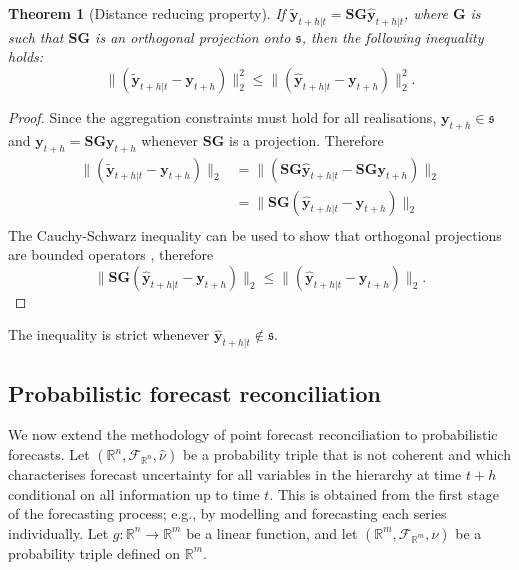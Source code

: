 \documentclass[12pt]{article}
\newtheorem{theo}{Theorem}[section]
\theoremstyle{definition}
\begin{document}
\begin{theo}[Distance reducing property]
	If $\tilde{\bm{y}}_{t+h|t}=\bm{S}\bm{G}\hat{\bm{y}}_{t+h|t}$, where $\bm{G}$ is such that $\bm{S}\bm{G}$ is an orthogonal projection onto $\mathfrak{s}$, then the following inequality holds:
	  \begin{equation}
	    \|(\tilde{\bm{y}}_{t+h|t}-\bm{y}_{t+h})\|^2_2\le\|(\hat{\bm{y}}_{t+h|t}-\bm{y}_{t+h})\|^2_2.
	  \end{equation}
\end{theo}
\begin{proof}
	Since the aggregation constraints must hold for all realisations, $\bm{y}_{t+h}\in\mathfrak{s}$ and $\bm{y}_{t+h}=\bm{S}\bm{G}\bm{y}_{t+h}$ whenever $\bm{S}\bm{G}$ is a projection. Therefore
	\begin{align}
	\|(\tilde{\bm{y}}_{t+h|t}-\bm{y}_{t+h})\|_2&=\|(\bm{S}\bm{G}\hat{\bm{y}}_{t+h|t}-\bm{S}\bm{G}\bm{y}_{t+h})\|_2\\
	&=\|\bm{S}\bm{G}(\hat{\bm{y}}_{t+h|t}-\bm{y}_{t+h})\|_2\\
	\end{align}
	The Cauchy-Schwarz inequality can be used to show that orthogonal projections are bounded operators \citep{Hun2001}, therefore
	 \begin{equation*}
	 \|\bm{S}\bm{G}(\hat{\bm{y}}_{t+h|t}-\bm{y}_{t+h})\|_2\le
	 \|(\hat{\bm{y}}_{t+h|t}-\bm{y}_{t+h})\|_2.
	 \end{equation*}
\end{proof}
The inequality is strict whenever $\hat{\bm{y}}_{t+h|t}\notin\mathfrak{s}$.


\subsection{Probabilistic forecast reconciliation}

We now extend the methodology of point forecast reconciliation to probabilistic forecasts.
Let $(\mathbb{R}^n, \mathscr{F}_{\mathbb{R}^n}, \hat{\nu})$ be a probability triple that is not coherent and which characterises forecast uncertainty for all variables in the hierarchy at time $t+h$ conditional on all information up to time $t$. This is obtained from the first stage of the forecasting process; e.g., by modelling and forecasting each series individually. Let $g:\mathbb{R}^n \rightarrow \mathbb{R}^m $ be a linear function, and let $(\mathbb{R}^m, \mathscr{F}_{\mathbb{R}^m}, \nu)$ be a probability triple defined on $\mathbb{R}^m$.
\end{document}
